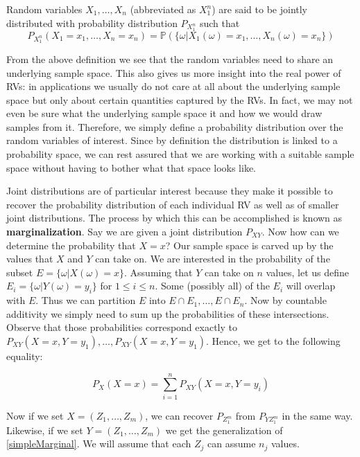 \documentclass[a4paper,11pt,leqno]{report}
\begin{document}
\begin{Definition}
Random variables $ X_{1}, \ldots, X_{n} $ (abbreviated as $ X^{n}_{1} $) 
are said to be jointly distributed with probability distribution $ P_{X_{1}^{n}} $ such that
$$ P_{X^{n}_{1}}(X_{1}=x_{1}, \ldots, X_{n}=x_{n}) = \mathbb{P}(\{\omega|X_{1}(\omega) = x_{1}, \ldots, X_{n}(\omega)=x_{n}\}) $$
\end{Definition}

From the above definition we see that the random variables need to share an underlying sample space. This also gives us more
insight into the real power of RVs: in applications we usually do not care at all about the underlying sample space but only about
certain quantities captured by the RVs. In fact, we may not even be sure what the underlying sample space it and how we would
draw samples from it. Therefore, we simply define a probability distribution over the random variables of interest. Since by definition
the distribution is linked to a probability space, we can rest assured that we are working with a suitable sample space without
having to bother what that space looks like.

Joint distributions are of particular interest because they make it possible to recover the probability distribution of each individual
RV as well as of smaller joint distributions. The process by which this can be accomplished is known as \textbf{marginalization}. Say
we are given a joint distribution $ P_{XY} $. Now how can we determine the probability that $ X=x $? Our sample space is carved
up by the values that $ X $ and $ Y $ can take on. We are interested in the probability of the subset $ E = \{\omega|X(\omega)=x\} $.
Assuming that $ Y $ can take on $ n $ values, let us define $ E_{i} = \{\omega| Y(\omega) = y_{i}\} $ for $ 1 \leq i \leq n $.
Some (possibly all) of the $ E_{i} $ will overlap with $ E $. Thus we can partition $ E $ into $ E\cap E_{1}, \ldots, E \cap E_{n} $.
Now by countable additivity we simply need to sum up the probabilities of these intersections. Observe that those probabilities
correspond exactly to $ P_{XY}(X=x,Y=y_{1}), \ldots, P_{XY}(X=x,Y=y_{1}) $. Hence, we get to the following equality:

\begin{equation} \label{simpleMarginal}
P_{X}(X=x) = \overset{n}{\underset{i=1}{\sum}} P_{XY}(X=x,Y=y_{i}) 
\end{equation}

Now if we set $ X = (Z_{1}, \ldots, Z_{m}) $, we can recover $ P_{Z_{1}^{m}} $ from $ P_{YZ_{1}^{m}} $ in the same way. Likewise,
if we set $ Y = (Z_{1}, \ldots, Z_{m}) $ we get the generalization of \ref{simpleMarginal}. We will assume that each $ Z_{j} $
can assume $ n_{j} $ values.
\end{document}
